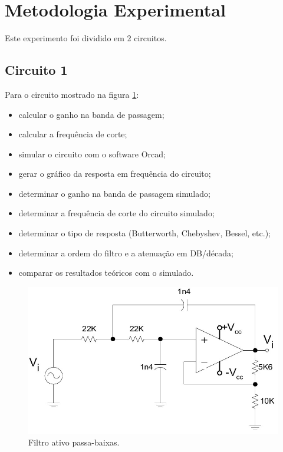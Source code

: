 \newpage
\section{Metodologia Experimental}

Este experimento foi dividido em 2 circuitos.


\subsection{Circuito 1}
Para o circuito mostrado na figura \ref{f_cir1}:

\begin{itemize}
\item calcular o ganho na banda de passagem;
\item calcular a frequência de corte;
\item simular o circuito com o software Orcad;
\item gerar o gráfico da resposta em frequência do circuito;
\item determinar o ganho na banda de passagem simulado;
\item determinar a frequência de corte do circuito simulado;
\item determinar o tipo de resposta (Butterworth, Chebyshev, Bessel, etc.);
\item determinar a ordem do filtro e a atenuação em DB/década;
\item comparar os resultados teóricos com o simulado.
\end{itemize}

\begin{figure}[H]
\centering
\includegraphics[scale=0.3]{Imagens/cir1.jpg}
\caption{Filtro ativo passa-baixas.}
\label{f_cir1}
\end{figure}



